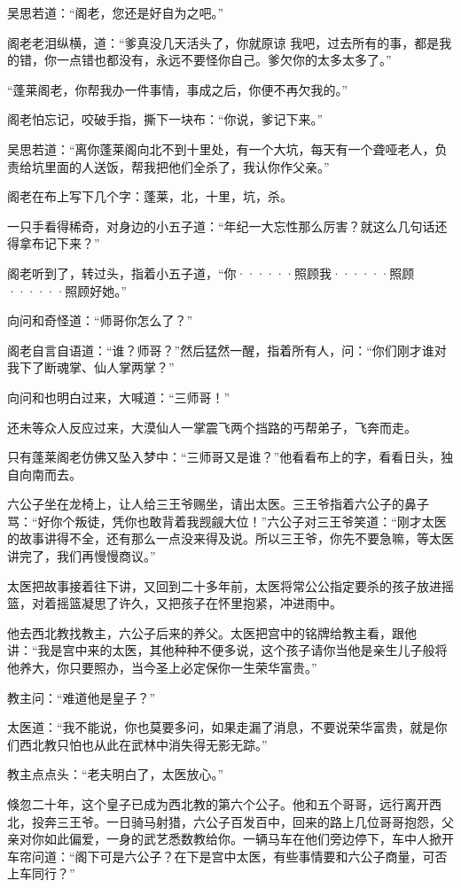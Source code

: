 吴思若道：“阁老，您还是好自为之吧。”

阁老老泪纵横，道：“爹真没几天活头了，你就原谅
我吧，过去所有的事，都是我的错，你一点错也都没有，永远不要怪你自己。爹欠你的太多太多了。”

“蓬莱阁老，你帮我办一件事情，事成之后，你便不再欠我的。”

阁老怕忘记，咬破手指，撕下一块布：“你说，爹记下来。”

吴思若道：“离你蓬莱阁向北不到十里处，有一个大坑，每天有一个聋哑老人，负责给坑里面的人送饭，帮我把他们全杀了，我认你作父亲。”

阁老在布上写下几个字：蓬莱，北，十里，坑，杀。

一只手看得稀奇，对身边的小五子道：“年纪一大忘性那么厉害？就这么几句话还得拿布记下来？”

阁老听到了，转过头，指着小五子道，“你······照顾我······照顾······照顾好她。”

向问和奇怪道：“师哥你怎么了？”

阁老自言自语道：“谁？师哥？”然后猛然一醒，指着所有人，问：“你们刚才谁对我下了断魂掌、仙人掌两掌？”

向问和也明白过来，大喊道：“三师哥！”

还未等众人反应过来，大漠仙人一掌震飞两个挡路的丐帮弟子，飞奔而走。

只有蓬莱阁老仿佛又坠入梦中：“三师哥又是谁？”他看看布上的字，看看日头，独自向南而去。
\newline

六公子坐在龙椅上，让人给三王爷赐坐，请出太医。三王爷指着六公子的鼻子骂：“好你个叛徒，凭你也敢背着我觊觎大位！”六公子对三王爷笑道：“刚才太医的故事讲得不全，还有那么一点没来得及说。所以三王爷，你先不要急嘛，等太医讲完了，我们再慢慢商议。”
\newline

太医把故事接着往下讲，又回到二十多年前，太医将常公公指定要杀的孩子放进摇篮，对着摇篮凝思了许久，又把孩子在怀里抱紧，冲进雨中。

他去西北教找教主，六公子后来的养父。太医把宫中的铭牌给教主看，跟他讲：“我是宫中来的太医，其他种种不便多说，这个孩子请你当他是亲生儿子般将他养大，你只要照办，当今圣上必定保你一生荣华富贵。”

教主问：“难道他是皇子？”

太医道：“我不能说，你也莫要多问，如果走漏了消息，不要说荣华富贵，就是你们西北教只怕也从此在武林中消失得无影无踪。”

教主点点头：“老夫明白了，太医放心。”

倏忽二十年，这个皇子已成为西北教的第六个公子。他和五个哥哥，远行离开西北，投奔三王爷。一日骑马射猎，六公子百发百中，回来的路上几位哥哥抱怨，父亲对你如此偏爱，一身的武艺悉数教给你。一辆马车在他们旁边停下，车中人掀开车帘问道：“阁下可是六公子？在下是宫中太医，有些事情要和六公子商量，可否上车同行？”
\newline


